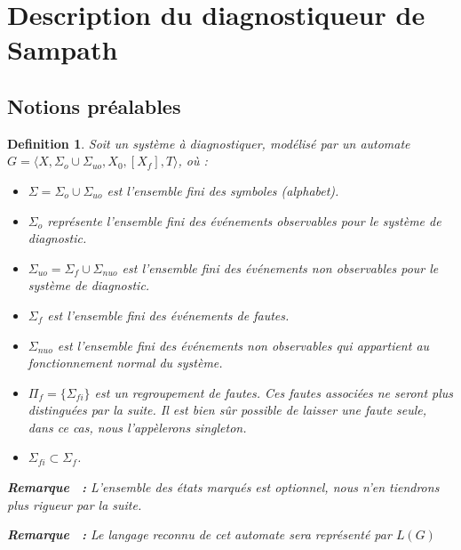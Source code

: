 \documentclass{article}
\newtheorem{mydef}{Definition}
\newcounter{rmq}[section]
\newenvironment{remarque}{\addtocounter{rmq}{1}\textbf{Remarque \thermq \  :}}{}
\newcounter{ex}[section]
\begin{document}
\section{Description du diagnostiqueur de Sampath}

\subsection{Notions pr\'ealables}

\begin{mydef}
Soit un syst\`eme \`a diagnostiquer, mod\'elis\'e par un automate $G=\langle X, \Sigma_o \cup \Sigma_{uo}, X_0, [X_f], T \rangle$, o\`u :
\begin{itemize}
\item $\Sigma=\Sigma_o \cup \Sigma_{uo}$ est l'ensemble fini des symboles (alphabet).
\item $\Sigma_o$ repr\'esente l'ensemble fini des \'ev\'enements observables pour le syst\`eme de diagnostic.
\item $\Sigma_{uo}=\Sigma_f \cup \Sigma_{nuo}$ est l'ensemble fini des \'ev\'enements non observables pour le syst\`eme de diagnostic.
\item $\Sigma_{f}$ est l'ensemble fini des \'ev\'enements de fautes.
\item $\Sigma_{nuo}$ est l'ensemble fini des \'ev\'enements non observables qui appartient au fonctionnement normal du syst\`eme.
\item $\Pi_f=\{\Sigma_{fi}\}$ est un regroupement de fautes. Ces fautes associ\'ees ne seront plus distingu\'ees par la suite. Il est bien s\^ur possible de laisser une faute seule, dans ce cas, nous l'app\`elerons singleton.
\item $\Sigma_{fi} \subset \Sigma_f$.
\end{itemize}

\begin{remarque}
L'ensemble des \'etats marqu\'es est optionnel, nous n'en tiendrons plus rigueur par la suite.
\end{remarque}


\begin{remarque}
Le langage reconnu de cet automate sera repr\'esent\'e par $L(G)$
\end{remarque}

\end{mydef}
\end{document}
